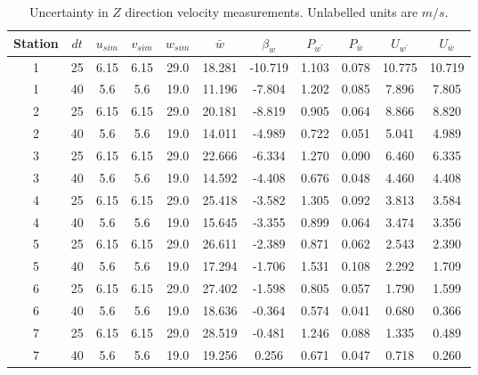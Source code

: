 \renewcommand\baselinestretch{1.3}\selectfont
\begin{table}[H]
\begin{center}
\begin{tabular}{|ccccccccccc|}
	\hline
	Station & $dt$ & $u_{sim}$ & $v_{sim}$ & $w_{sim}$ & $\bar{w}$ & $\beta_w$ & $P_{w^{\prime}}$ & $P_{\bar{w}}$ & $U_{w^{\prime}}$ & $U_{\bar{w}}$\\
	\hline
	1 & 25 & 6.15 & 6.15 & 29.0 & 18.281 & -10.719 & 1.103 & 0.078 & 10.775 & 10.719\\
	1 & 40 & 5.6 & 5.6 & 19.0 & 11.196 & -7.804 & 1.202 & 0.085 & 7.896 & 7.805\\
	2 & 25 & 6.15 & 6.15 & 29.0 & 20.181 & -8.819 & 0.905 & 0.064 & 8.866 & 8.820\\
	2 & 40 & 5.6 & 5.6 & 19.0 & 14.011 & -4.989 & 0.722 & 0.051 & 5.041 & 4.989\\
	3 & 25 & 6.15 & 6.15 & 29.0 & 22.666 & -6.334 & 1.270 & 0.090 & 6.460 & 6.335\\
	3 & 40 & 5.6 & 5.6 & 19.0 & 14.592 & -4.408 & 0.676 & 0.048 & 4.460 & 4.408\\
	4 & 25 & 6.15 & 6.15 & 29.0 & 25.418 & -3.582 & 1.305 & 0.092 & 3.813 & 3.584\\
	4 & 40 & 5.6 & 5.6 & 19.0 & 15.645 & -3.355 & 0.899 & 0.064 & 3.474 & 3.356\\
	5 & 25 & 6.15 & 6.15 & 29.0 & 26.611 & -2.389 & 0.871 & 0.062 & 2.543 & 2.390\\
	5 & 40 & 5.6 & 5.6 & 19.0 & 17.294 & -1.706 & 1.531 & 0.108 & 2.292 & 1.709\\
	6 & 25 & 6.15 & 6.15 & 29.0 & 27.402 & -1.598 & 0.805 & 0.057 & 1.790 & 1.599\\
	6 & 40 & 5.6 & 5.6 & 19.0 & 18.636 & -0.364 & 0.574 & 0.041 & 0.680 & 0.366\\
	7 & 25 & 6.15 & 6.15 & 29.0 & 28.519 & -0.481 & 1.246 & 0.088 & 1.335 & 0.489\\
	7 & 40 & 5.6 & 5.6 & 19.0 & 19.256 & 0.256 & 0.671 & 0.047 & 0.718 & 0.260\\
	\hline
\end{tabular}
\caption{Uncertainty in $Z$ direction velocity measurements. Unlabelled units are $m/s$.}
\label{table:uncertainties_w}
\end{center}
\end{table}
\renewcommand\baselinestretch{2}\selectfont
